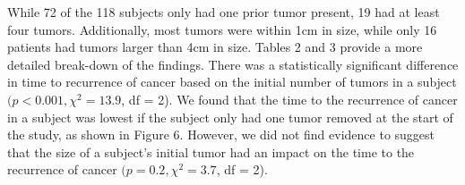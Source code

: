 \documentclass{article}
\begin{document}
	While 72 of the 118 subjects only had one prior tumor present, 19 had at least four tumors. Additionally, most tumors were within 1cm in size, while only 16 patients had tumors larger than 4cm in size. Tables 2 and 3 provide a more detailed break-down of the findings. There was a statistically significant difference in time to recurrence of cancer based on the initial number of tumors in a subject $(p < 0.001, \chi^2 = 13.9$, df = 2). We found that the time to the recurrence of cancer in a subject was lowest if the subject only had one tumor removed at the start of the study, as shown in Figure 6. However, we did not find evidence to suggest that the size of a subject’s initial tumor had an impact on the time to the recurrence of cancer $(p = 0.2, \chi^2 = 3.7$, df = 2).

\end{document}
